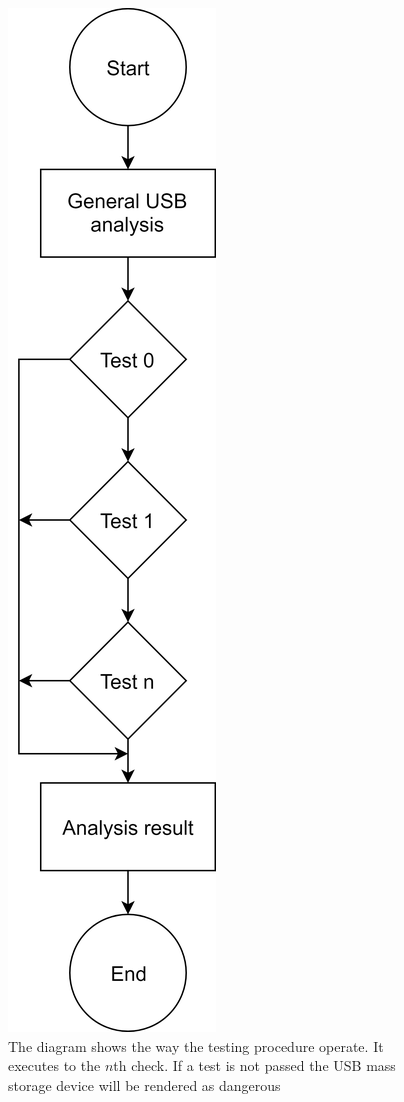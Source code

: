 \documentclass[sigconf]{acmart}
\begin{document}
\begin{figure}[htp]
    \centering
    \includegraphics[scale=0.135]{images/tests_flow.png}
    \caption{The diagram shows the way the testing procedure operate. It executes to the $n$th check. If a test is not passed the USB mass storage device will be rendered as dangerous}
    \label{fig:test_flow}
\end{figure}
\end{document}
